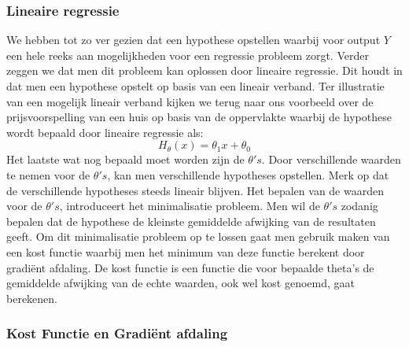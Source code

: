 \subsubsection{Lineaire regressie}\label{lineaire regressie}

We hebben tot zo ver gezien dat een hypothese opstellen waarbij voor output $Y$ een hele reeks aan mogelijkheden voor een regressie probleem zorgt. Verder zeggen we dat men dit probleem kan oplossen door lineaire regressie. Dit houdt in dat men een hypothese opstelt op basis van een lineair verband.
%
Ter illustratie van een mogelijk lineair verband kijken we terug naar ons voorbeeld over de prijsvoorspelling van een huis op basis van de oppervlakte waarbij de hypothese wordt bepaald door lineaire regressie als:
\[H_{\theta}(x) = \theta_{1}x + \theta_{0}\]
%
Het laatste wat nog bepaald moet worden zijn de $\theta's$. Door verschillende waarden te nemen voor de $\theta's$, kan men verschillende hypotheses opstellen. Merk op dat de verschillende hypotheses steeds lineair blijven. Het bepalen van de waarden voor de $\theta's$, introduceert het minimalisatie probleem. Men wil de $\theta's$ zodanig bepalen dat de hypothese de kleinste gemiddelde afwijking van de resultaten geeft. Om dit minimalisatie probleem op te lossen gaat men gebruik maken van een kost functie  waarbij men het minimum van deze functie berekent door gradi\"ent afdaling. De kost functie is een functie die voor bepaalde theta's de gemiddelde afwijking van de echte waarden, ook wel kost genoemd, gaat berekenen.  



\subsubsection{Kost Functie en Gradi\"ent afdaling}\label{Kost Functie en Gradule afdaling}

